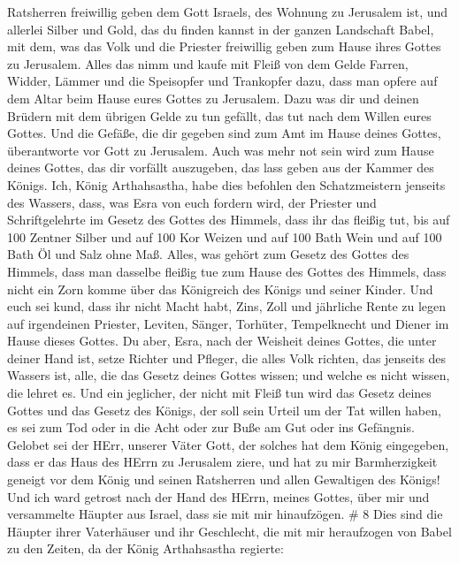 Ratsherren freiwillig geben dem Gott Israels, des Wohnung zu Jerusalem
ist,  und allerlei Silber und Gold, das du finden kannst in
der ganzen Landschaft Babel, mit dem, was das Volk und die Priester
freiwillig geben zum Hause ihres Gottes zu Jerusalem. 
Alles das nimm und kaufe mit Fleiß von dem Gelde Farren, Widder, Lämmer
und die Speisopfer und Trankopfer dazu, dass man opfere auf dem Altar
beim Hause eures Gottes zu Jerusalem.  Dazu was dir und
deinen Brüdern mit dem übrigen Gelde zu tun gefällt, das tut nach dem
Willen eures Gottes.  Und die Gefäße, die dir gegeben sind
zum Amt im Hause deines Gottes, überantworte vor Gott zu Jerusalem.
 Auch was mehr not sein wird zum Hause deines Gottes, das
dir vorfällt auszugeben, das lass geben aus der Kammer des Königs.
 Ich, König Arthahsastha, habe dies befohlen den
Schatzmeistern jenseits des Wassers, dass, was Esra von euch fordern
wird, der Priester und Schriftgelehrte im Gesetz des Gottes des Himmels,
dass ihr das fleißig tut,  bis auf 100 Zentner Silber und
auf 100 Kor Weizen und auf 100 Bath Wein und auf 100 Bath Öl und Salz
ohne Maß.  Alles, was gehört zum Gesetz des Gottes des
Himmels, dass man dasselbe fleißig tue zum Hause des Gottes des Himmels,
dass nicht ein Zorn komme über das Königreich des Königs und seiner
Kinder.  Und euch sei kund, dass ihr nicht Macht habt,
Zins, Zoll und jährliche Rente zu legen auf irgendeinen Priester,
Leviten, Sänger, Torhüter, Tempelknecht und Diener im Hause dieses
Gottes.  Du aber, Esra, nach der Weisheit deines Gottes,
die unter deiner Hand ist, setze Richter und Pfleger, die alles Volk
richten, das jenseits des Wassers ist, alle, die das Gesetz deines
Gottes wissen; und welche es nicht wissen, die lehret es. 
Und ein jeglicher, der nicht mit Fleiß tun wird das Gesetz deines Gottes
und das Gesetz des Königs, der soll sein Urteil um der Tat willen haben,
es sei zum Tod oder in die Acht oder zur Buße am Gut oder ins Gefängnis.
 Gelobet sei der HErr, unserer Väter Gott, der solches hat
dem König eingegeben, dass er das Haus des HErrn zu Jerusalem ziere,
 und hat zu mir Barmherzigkeit geneigt vor dem König und
seinen Ratsherren und allen Gewaltigen des Königs! Und ich ward getrost
nach der Hand des HErrn, meines Gottes, über mir und versammelte Häupter
aus Israel, dass sie mit mir hinaufzögen. \# 8  Dies sind
die Häupter ihrer Vaterhäuser und ihr Geschlecht, die mit mir
heraufzogen von Babel zu den Zeiten, da der König Arthahsastha regierte:

